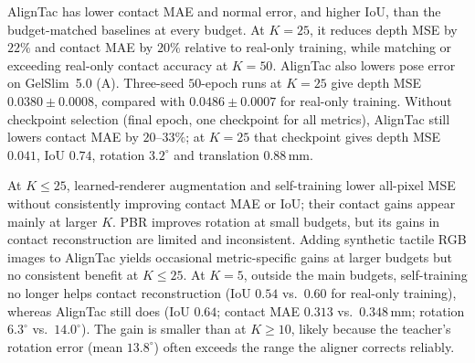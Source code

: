 AlignTac has lower contact MAE and normal error, and higher IoU, than the budget-matched baselines at every budget. At $K=25$, it reduces depth MSE by $22\%$ and contact MAE by $20\%$ relative to real-only training, while matching or exceeding real-only contact accuracy at $K=50$. AlignTac also lowers pose error on GelSlim~5.0 (A). Three-seed $50$-epoch runs at $K=25$ give depth MSE $0.0380\pm0.0008$, compared with $0.0486\pm0.0007$ for real-only training. Without checkpoint selection (final epoch, one checkpoint for all metrics), AlignTac still lowers contact MAE by $20$--$33\%$; at $K=25$ that checkpoint gives depth MSE $0.041$, IoU $0.74$, rotation $3.2^\circ$ and translation $0.88\,$mm.

At $K\le25$, learned-renderer augmentation and self-training lower all-pixel MSE without consistently improving contact MAE or IoU; their contact gains appear mainly at larger $K$. PBR improves rotation at small budgets, but its gains in contact reconstruction are limited and inconsistent. Adding synthetic tactile RGB images to AlignTac yields occasional metric-specific gains at larger budgets but no consistent benefit at $K\le25$. At $K=5$, outside the main budgets, self-training no longer helps contact reconstruction (IoU $0.54$ vs.\ $0.60$ for real-only training), whereas AlignTac still does (IoU $0.64$; contact MAE $0.313$ vs.\ $0.348\,$mm; rotation $6.3^\circ$ vs.\ $14.0^\circ$). The gain is smaller than at $K\ge10$, likely because the teacher's rotation error (mean $13.8^\circ$) often exceeds the range the aligner corrects reliably.

